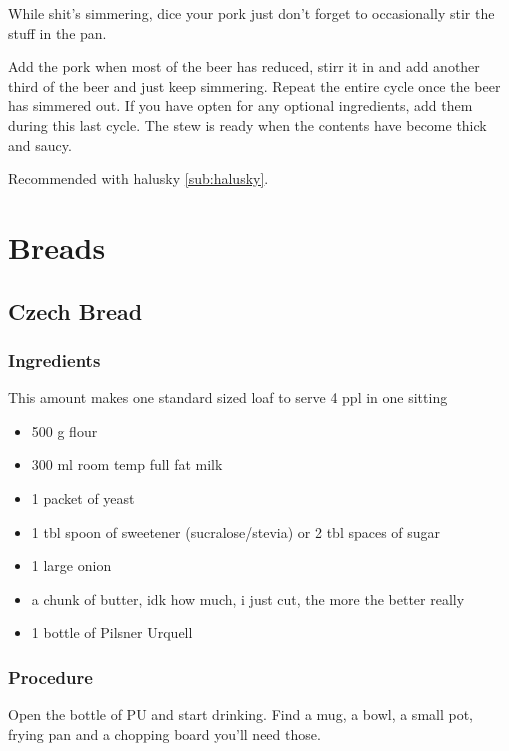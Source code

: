 \documentclass[10pt]{article}
\begin{document}
While shit's simmering, dice your pork just don't forget to occasionally stir the stuff in the pan. \par

Add the pork when most of the beer has reduced, stirr it in and add another third of the beer and just keep simmering. Repeat the entire cycle once the beer has simmered out. If you have opten for any optional ingredients, add them during this last cycle. The stew is ready when the contents have become thick and saucy.\par

Recommended with halusky \ref{sub:halusky}.


\section{Breads}%
\label{sec:breads}

\subsection{Czech Bread}%
\label{sub:czech_bread}

\subsubsection{Ingredients}%
\label{ssub:czech_bread_ingredients}
This amount makes one standard sized loaf to serve 4 ppl in one sitting

\begin{itemize}
	\item 500 g flour
	\item 300 ml room temp full fat milk
	\item 1 packet of yeast
	\item 1 tbl spoon of sweetener (sucralose/stevia) or 2 tbl spaces of sugar
	\item 1 large onion
	\item a chunk of butter, idk how much, i just cut, the more the better really
	\item 1 bottle of Pilsner Urquell
\end{itemize}
\subsubsection{Procedure}%
\label{ssub:czech_bread_procedure}

Open the bottle of PU and start drinking. Find a mug, a bowl, a small pot, frying pan and a chopping board you'll need those.\par
\end{document}
